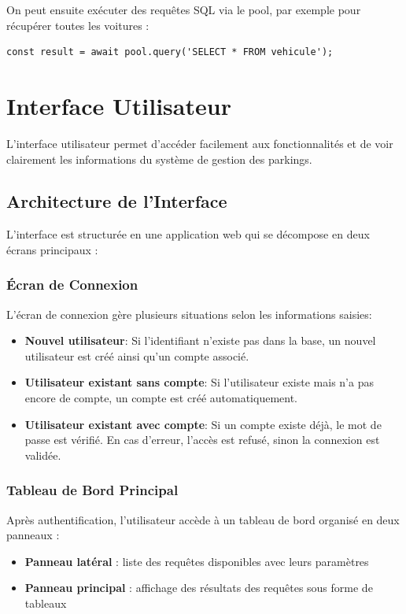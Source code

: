 \documentclass[a4paper,12pt]{report}
\begin{document}
On peut ensuite exécuter des requêtes SQL via le pool, par exemple pour récupérer toutes les voitures :

\begin{verbatim}
const result = await pool.query('SELECT * FROM vehicule');
\end{verbatim}

\section{Interface Utilisateur}

L’interface utilisateur permet d’accéder facilement aux fonctionnalités et de voir clairement les informations du système de gestion des parkings.

\subsection{Architecture de l'Interface}

L'interface est structurée en une application web qui se décompose en deux écrans principaux :

\subsubsection*{Écran de Connexion}
\label{subsubsec:ecran-connexion}

L’écran de connexion gère plusieurs situations selon les informations saisies:

\begin{itemize}
    \item \textbf{Nouvel utilisateur}: Si l’identifiant n’existe pas dans la base, un nouvel utilisateur est créé ainsi qu’un compte associé.
    \item \textbf{Utilisateur existant sans compte}: Si l’utilisateur existe mais n’a pas encore de compte, un compte est créé automatiquement.

    \item \textbf{Utilisateur existant avec compte}: Si un compte existe déjà, le mot de passe est vérifié. En cas d’erreur, l’accès est refusé, sinon la connexion est validée.
\end{itemize}



\subsubsection*{Tableau de Bord Principal}
Après authentification, l'utilisateur accède à un tableau de bord organisé en deux panneaux :
\begin{itemize}
    \item \textbf{Panneau latéral} : liste des requêtes disponibles avec leurs paramètres
    \item \textbf{Panneau principal} : affichage des résultats des requêtes sous forme de tableaux
\end{itemize}
\end{document}
